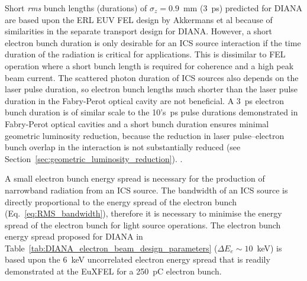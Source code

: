 \documentclass[../main.tex]{subfiles}
\begin{document}
Short \textit{rms} bunch lengths (durations) of $\sigma_{z}=0.9$~\si{\milli\meter} (3~\si{\pico\second}) predicted for DIANA are based upon the ERL EUV FEL design by Akkermans et al\cite{akkermans2017compact} because of similarities in the separate transport design for DIANA. However, a short electron bunch duration is only desirable for an ICS source interaction if the time duration of the radiation is critical for applications. This is dissimilar to FEL operation where a short bunch length is required for coherence and a high peak beam current. The scattered photon duration of ICS sources also depends on the laser pulse duration, so electron bunch lengths much shorter than the laser pulse duration in the Fabry-Perot optical cavity are not beneficial. A 3~\si{\pico\second} electron bunch duration is of similar scale to the 10's~\si{\pico\second} pulse durations demonstrated in Fabry-Perot optical cavities and a short bunch duration ensures minimal geometric luminosity reduction, because the reduction in laser pulse--electron bunch overlap in the interaction is not substantially reduced (see Section~\ref{sec:geometric_luminosity_reduction}).  . 

A small electron bunch energy spread is necessary for the production of narrowband radiation from an ICS source. The bandwidth of an ICS source is directly proportional to the energy spread of the electron bunch (Eq.~\ref{eq:RMS_bandwidth}), therefore it is necessary to minimise the energy spread of the electron bunch for light source operations. The electron bunch energy spread proposed for DIANA in Table~\ref{tab:DIANA_electron_beam_design_parameters} ($\Delta E_{e} \sim 10$~\si{\kilo\electronvolt}) is based upon the 6~\si{\kilo\electronvolt} uncorrelated electron energy spread that is readily demonstrated at the EuXFEL \cite{tomin2021accurate} for a 250~\si{\pico\coulomb} electron bunch. 
\end{document}
